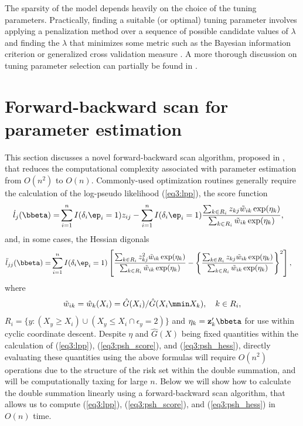 The sparsity of the model depends heavily on the choice of the tuning parameters. Practically, finding a suitable (or optimal) tuning parameter involves applying a penalization method over a sequence of possible candidate values of $\lambda$ and finding the $\lambda$ that minimizes some metric such as the Bayesian information criterion \citep{schwarz1978estimating} or generalized cross validation measure \citep{craven1978smoothing}. A more thorough discussion on tuning parameter selection can partially be found in 
 \cite{wang2007tuning, zhang2010regularization, wang2011consistent,  fan2013tuning, fu2017penalized, ni2018tuning}.

 \section{Forward-backward scan for parameter estimation}
 \label{s3:scan}
 This section discusses a novel forward-backward scan algorithm, proposed in \cite{kawaguchi2019scalable}, that reduces the computational complexity associated with parameter estimation from $O(n^2)$ to $O(n)$. Commonly-used optimization routines generally require the calculation of the log-pseudo likelihood (\ref{eq3:lpp}), the score function
 \begin{align}
\label{eq3:psh_score}
\dot{l}_j(\bbeta) = & \sum_{i=1}^n I(\delta_i\ep_i = 1) z_{ij} - \sum_{i = 1}^n I(\delta_i\ep_i = 1) \frac{ \sum_{k \in R_i} z_{kj} \tilde{w}_{ik}  \exp(\eta_k)}{\sum_{k \in R_i} \tilde{w}_{ik} \exp(\eta_k)}, 
\end{align}
and, in some cases, the Hessian digonals
\begin{align}
\label{eq3:psh_hess}
\ddot{l}_{jj}(\bbeta) = & \sum_{i=1}^n I(\delta_i\ep_i = 1) \left[ \frac{ \sum_{k \in R_i} z_{kj}^2 \tilde{w}_{ik}  \exp(\eta_k)}{\sum_{k \in R_i} \tilde{w}_{ik} \exp(\eta_k)} -  \left\{ \frac{ \sum_{k \in R_i} z_{kj} \tilde{w}_{ik}  \exp(\eta_k)}{\sum_{k \in R_i} \tilde{w}_{ik} \exp(\eta_k)} \right\}^2 \right], 
\end{align}
where  $$\tilde{w}_{ik} = \hat{w}_k(X_i) = \hat{G}(X_i) / \hat{G}(X_i \mmin X_k), \quad k \in R_i,$$ 
$R_i = \{y:(X_y \geq X_i) \cup (X_y \leq X_i \cap \epsilon_y =  2)\}$ and
$\eta_k = \mathbf{z}_k^\prime\bbeta$ for use within cyclic coordinate descent. {\color{blue} Despite $\eta$ and $\hat{G}(X)$ being fixed quantities within the calculation of (\ref{eq3:lpp}), (\ref{eq3:psh_score}), and (\ref{eq3:psh_hess}), directly evaluating these quantities using the above formulas will require $O(n^2)$ operations due to the structure of the risk set within the double summation, and will be computationally taxing for large $n$.} Below we will show how to calculate the double summation linearly using a forward-backward scan algorithm, that allows us to compute (\ref{eq3:lpp}), (\ref{eq3:psh_score}), and (\ref{eq3:psh_hess}) in $O(n)$ time.

